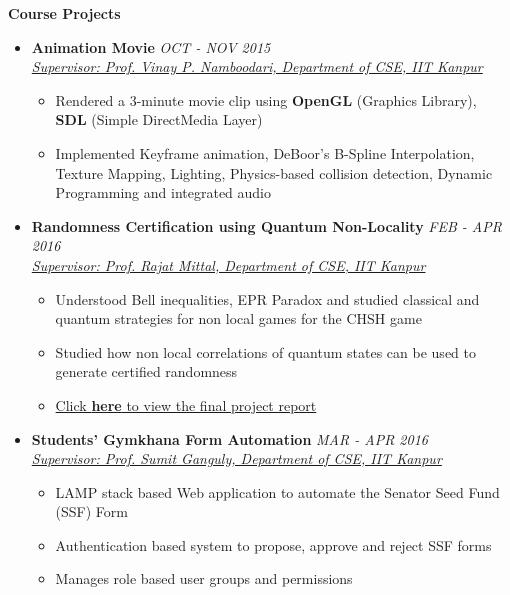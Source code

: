 \documentclass[letterpaper,11pt]{article}
\begin{document}
{\pagebreak

\Large{\textbf{Course Projects}}
\small
\begin{itemize}
    \item \textbf{Animation Movie} \hfill \textit{OCT - NOV 2015}\\
    \href{https://sites.google.com/site/vinaynamboodiri/}{\textit{Supervisor: Prof. Vinay P. Namboodari, Department of CSE, IIT Kanpur}}
    \begin{itemize}
        \item Rendered a 3-minute movie clip using \textbf{OpenGL} (Graphics Library), \textbf{SDL} (Simple DirectMedia Layer)
        \item Implemented Keyframe animation, DeBoor's B-Spline Interpolation, Texture Mapping, Lighting, Physics-based collision detection, Dynamic Programming and integrated audio
    \end{itemize}
    \item \textbf{Randomness Certification using Quantum Non-Locality} \hfill \textit{FEB - APR 2016}
        \\
        \href{http://www.cse.iitk.ac.in/users/rmittal/}{\textit{Supervisor: Prof. Rajat Mittal, Department of CSE, IIT Kanpur}}
        \begin{itemize}
            \item Understood Bell inequalities, EPR Paradox and studied classical and quantum strategies for non local games for the CHSH game
            \item Studied how non local correlations of quantum states can be used to generate certified randomness
            \item \href{http://home.iitk.ac.in/~kunalkap/Final_Project_Report_CS682.pdf}{Click \textbf{here} to view the final project report}
        \end{itemize}
    \item \textbf{Students' Gymkhana Form Automation} \hfill \textit{MAR - APR 2016}\\
        \href{http://www.cse.iitk.ac.in/users/sganguly/}{\textit{Supervisor: Prof. Sumit Ganguly, Department of CSE, IIT Kanpur}}
        \begin{itemize}
            \item LAMP stack based Web application to automate the Senator Seed Fund (SSF) Form
            \item Authentication based system to propose, approve and reject SSF forms
            \item Manages role based user groups and permissions
        \end{itemize}


\end{itemize}}
\end{document}
